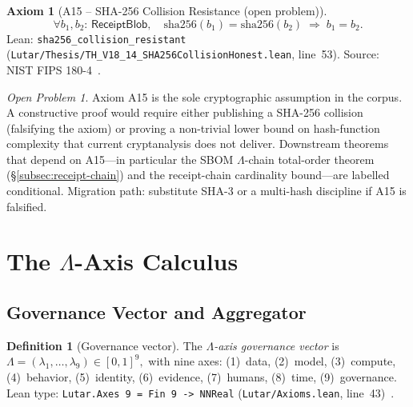 \documentclass[11pt,letterpaper]{article}
\theoremstyle{definition}
\newtheorem{definition}[theorem]{Definition}
\newtheorem{axiom}[theorem]{Axiom}
\theoremstyle{remark}
\newtheorem{openprob}[theorem]{Open Problem}
\begin{document}
\begin{axiom}[A15 -- SHA-256 Collision Resistance (open problem)]
\begin{equation}
  \forall b_1, b_2 :\,\mathsf{ReceiptBlob},\quad
  \mathrm{sha256}(b_1) = \mathrm{sha256}(b_2) \;\Rightarrow\; b_1 = b_2.
  \label{eq:A15}
\end{equation}
\textup{Lean:} \texttt{sha256\_collision\_resistant}
(\texttt{Lutar/Thesis/TH\_V18\_14\_SHA256CollisionHonest.lean}, line~53).
\textup{Source:} NIST FIPS 180-4~\cite{NIST-FIPS-180-4}.

\begin{openprob}
Axiom A15 is the sole cryptographic assumption in the corpus.
A constructive proof would require either publishing a SHA-256
collision (falsifying the axiom) or proving a non-trivial lower bound
on hash-function complexity that current cryptanalysis does not deliver.
Downstream theorems that depend on A15---in particular the SBOM
\(\Lambda\)-chain total-order theorem (\S\ref{subsec:receipt-chain})
and the receipt-chain cardinality bound---are labelled conditional.
Migration path: substitute SHA-3 or a multi-hash discipline if A15
is falsified.
\end{openprob}
\end{axiom}

\section{The \texorpdfstring{\(\Lambda\)}{Lambda}-Axis Calculus}
\label{sec:lambda}

\subsection{Governance Vector and Aggregator}

\begin{definition}[Governance vector]
The \emph{\(\Lambda\)-axis governance vector} is
\(
  \Lambda = (\lambda_1,\ldots,\lambda_9) \in [0,1]^9,
\)
with nine axes: (1)~data, (2)~model, (3)~compute, (4)~behavior,
(5)~identity, (6)~evidence, (7)~humans, (8)~time, (9)~governance.
Lean type: \texttt{Lutar.Axes 9 = Fin 9 -> NNReal}
(\texttt{Lutar/Axioms.lean}, line~43)~\cite{LutarThesisV14}.
\end{definition}
\end{document}
